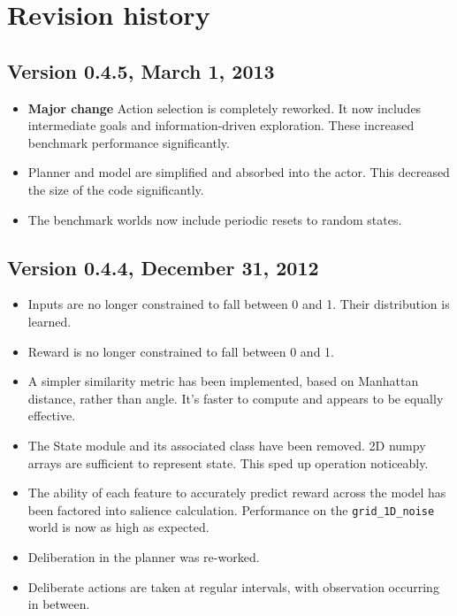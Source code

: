 \chapter{Revision history}

\section*{Version 0.4.5, March 1, 2013}

\begin{itemize}
\item {\bf Major change} Action selection is completely reworked. It now includes intermediate goals and information-driven exploration. These increased benchmark performance significantly.
\item Planner and model are simplified and absorbed into the actor. This decreased the size of the code significantly.
\item The benchmark worlds now include periodic resets to random states.
\end{itemize}

\section*{Version 0.4.4, December 31, 2012}

\begin{itemize}
\item Inputs are no longer constrained to fall between 0 and 1. Their distribution is learned.
\item Reward is no longer constrained to fall between 0 and 1.
\item A simpler similarity metric has been implemented, based on Manhattan distance, rather than angle. It's faster to compute and appears to be equally effective.
\item The State module and its associated class have been removed. 2D numpy arrays are sufficient to represent state. This sped up operation noticeably.
\item The ability of each feature to accurately predict reward across the model has been factored into salience calculation. Performance on the \texttt{grid\_1D\_noise} world is now as high as expected.
\item Deliberation in the planner was re-worked.
\item Deliberate actions are taken at regular intervals, with observation occurring in between. 
\end{itemize}

